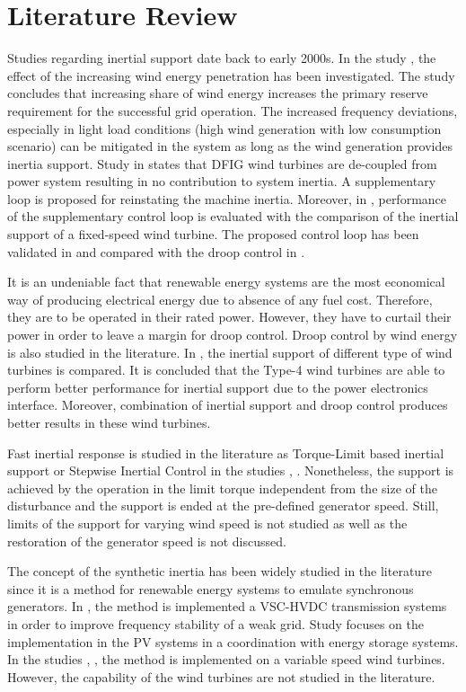 \section{Literature Review}
Studies regarding inertial support date back to early 2000s. In the study \cite{Lalor2004}, the effect of the increasing wind energy penetration has been investigated. The study concludes that increasing share of wind energy increases the primary reserve requirement for the successful grid operation. The increased frequency deviations, especially in light load conditions (high wind generation with low consumption scenario) can be mitigated in the system as long as the wind generation provides inertia support. Study in \cite{Ekanayake2003} states that DFIG wind turbines are de-coupled from power system resulting in no contribution to system inertia. A supplementary loop is proposed for reinstating the machine inertia. Moreover, in \cite{Ekanayake2004}, performance of the  supplementary control loop is evaluated with the comparison of the inertial support of a fixed-speed wind turbine. The proposed control loop has been validated in \cite{Morren2006} and compared with the droop control in \cite{Morren2006a}. \par 
It is an undeniable fact that renewable energy systems are the most economical way of producing electrical energy due to absence of any fuel cost. Therefore, they are to be operated in their rated power. However, they have to curtail their power in order to leave a margin for droop control. Droop control by wind energy is also studied in the literature. In \cite{Muljadi2012}, the inertial support of different type of wind turbines is compared. It is concluded that the Type-4 wind turbines are able to perform better performance for inertial support due to the power electronics interface. Moreover, combination of inertial support and droop control produces better results in these wind turbines.\par
Fast inertial response is studied in the literature as Torque-Limit based inertial support or Stepwise Inertial Control in the studies \cite{Wang2016b}, \cite{Wang2016}. Nonetheless, the support is achieved by the operation in the limit torque independent from the size of the disturbance and the support is ended at the pre-defined generator speed. Still, limits of the support for varying wind speed is not studied as well as the restoration of the generator speed is not discussed. \par
The concept of the synthetic inertia has been widely studied in the literature since it is a method for renewable energy systems to emulate synchronous generators. In \cite{Zhu2013a}, the method is implemented a VSC-HVDC transmission systems in order to improve frequency stability of a weak grid. Study \cite{Hernandez2017} focuses on the implementation in the PV systems in a coordination with energy storage systems. In the studies \cite{VanDeVyver2016}, \cite{Conroy2008}, the method is implemented on a variable speed wind turbines. However, the capability of the wind turbines are not studied in the literature. 
